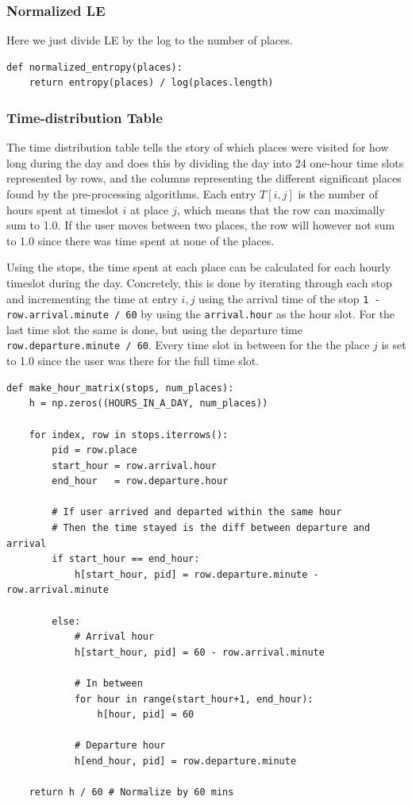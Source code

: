 \subsubsection{Normalized LE} 
Here we just divide LE by the log to the number of places.

\begin{verbatim}
def normalized_entropy(places):
    return entropy(places) / log(places.length)
\end{verbatim}

\subsubsection{Time-distribution Table}
The time distribution table tells the story of which places were visited for how long during the day and does this by dividing the day into 24 one-hour time slots represented by rows, and the columns representing the different significant places found by the pre-processing algorithms. Each entry $T[i,j]$ is the number of hours spent at timeslot $i$ at place $j$, which means that the row can maximally sum to 1.0. If the user moves between two places, the row will however not sum to 1.0 since there was time spent at none of the places.

Using the stops, the time spent at each place can be calculated for each hourly timeslot during the day. Concretely, this is done by iterating through each stop and incrementing the time at entry $i,j$ using the arrival time of the stop \verb|1 - row.arrival.minute / 60| by using the \verb|arrival.hour| as the hour slot. For the last time slot the same is done, but using the departure time \verb|row.departure.minute / 60|. Every time slot in between for the the place $j$ is set to 1.0 since the user was there for the full time slot.

\begin{verbatim}
def make_hour_matrix(stops, num_places):
    h = np.zeros((HOURS_IN_A_DAY, num_places))
    
    for index, row in stops.iterrows():
        pid = row.place
        start_hour = row.arrival.hour
        end_hour   = row.departure.hour
        
        # If user arrived and departed within the same hour
        # Then the time stayed is the diff between departure and arrival
        if start_hour == end_hour:
            h[start_hour, pid] = row.departure.minute - row.arrival.minute
        
        else:
            # Arrival hour
            h[start_hour, pid] = 60 - row.arrival.minute

            # In between
            for hour in range(start_hour+1, end_hour):
                h[hour, pid] = 60

            # Departure hour
            h[end_hour, pid] = row.departure.minute
        
    return h / 60 # Normalize by 60 mins
\end{verbatim}



